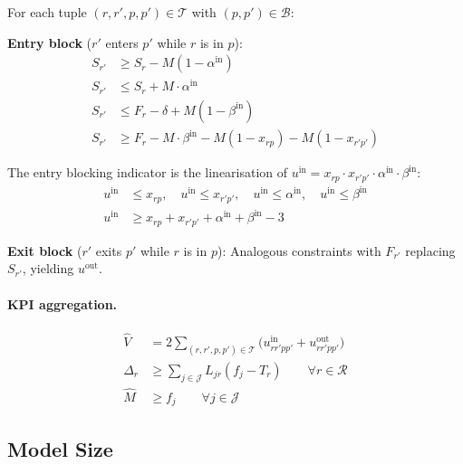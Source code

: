 For each tuple $(r, r', p, p') \in \mathcal{T}$ with $(p,p') \in \mathcal{B}$:

\vspace{0.5em}
\noindent\textbf{Entry block} ($r'$ enters $p'$ while $r$ is in $p$):
\begin{align}
    S_{r'} &\geq S_r - M(1 - \alpha^{\text{in}}) \label{eq:alpha-in-lb} \\
    S_{r'} &\leq S_r + M \cdot \alpha^{\text{in}} \label{eq:alpha-in-ub} \\
    S_{r'} &\leq F_r - \delta + M(1 - \beta^{\text{in}}) \label{eq:beta-in-ub} \\
    S_{r'} &\geq F_r - M \cdot \beta^{\text{in}}
             - M(1-x_{rp}) - M(1-x_{r'p'}) \label{eq:beta-in-lb}
\end{align}

\noindent The entry blocking indicator is the linearisation of
$u^{\text{in}} = x_{rp} \cdot x_{r'p'} \cdot \alpha^{\text{in}} \cdot \beta^{\text{in}}$:
\begin{align}
    u^{\text{in}} &\leq x_{rp}, \quad u^{\text{in}} \leq x_{r'p'}, \quad
    u^{\text{in}} \leq \alpha^{\text{in}}, \quad u^{\text{in}} \leq \beta^{\text{in}}
    \label{eq:u-in-ub} \\
    u^{\text{in}} &\geq x_{rp} + x_{r'p'} + \alpha^{\text{in}} + \beta^{\text{in}} - 3
    \label{eq:u-in-lb}
\end{align}

\noindent\textbf{Exit block} ($r'$ exits $p'$ while $r$ is in $p$):
Analogous constraints with $F_{r'}$ replacing $S_{r'}$, yielding $u^{\text{out}}$.

\paragraph{KPI aggregation.}

\begin{align}
    \hat{V} &= 2 \sum_{(r,r',p,p') \in \mathcal{T}}
               \bigl(u^{\text{in}}_{rr'pp'} + u^{\text{out}}_{rr'pp'}\bigr)
    \label{eq:movements} \\
    \Delta_r &\geq \sum_{j \in \mathcal{J}} L_{jr}(f_j - T_r)
    \qquad \forall r \in \mathcal{R}
    \label{eq:delay} \\
    \hat{M} &\geq f_j
    \qquad \forall j \in \mathcal{J}
    \label{eq:makespan}
\end{align}

\subsection{Model Size}

